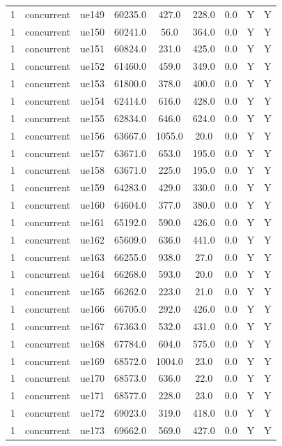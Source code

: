 \begin{table}[ht]
\begin{tabular}{|c|c|c|c|c|c|c|c|c|}
1 & concurrent & ue149 & 60235.0 & 427.0 & 228.0 & 0.0 & Y & Y \\
1 & concurrent & ue150 & 60241.0 & 56.0 & 364.0 & 0.0 & Y & Y \\
1 & concurrent & ue151 & 60824.0 & 231.0 & 425.0 & 0.0 & Y & Y \\
1 & concurrent & ue152 & 61460.0 & 459.0 & 349.0 & 0.0 & Y & Y \\
1 & concurrent & ue153 & 61800.0 & 378.0 & 400.0 & 0.0 & Y & Y \\
1 & concurrent & ue154 & 62414.0 & 616.0 & 428.0 & 0.0 & Y & Y \\
1 & concurrent & ue155 & 62834.0 & 646.0 & 624.0 & 0.0 & Y & Y \\
1 & concurrent & ue156 & 63667.0 & 1055.0 & 20.0 & 0.0 & Y & Y \\
1 & concurrent & ue157 & 63671.0 & 653.0 & 195.0 & 0.0 & Y & Y \\
1 & concurrent & ue158 & 63671.0 & 225.0 & 195.0 & 0.0 & Y & Y \\
1 & concurrent & ue159 & 64283.0 & 429.0 & 330.0 & 0.0 & Y & Y \\
1 & concurrent & ue160 & 64604.0 & 377.0 & 380.0 & 0.0 & Y & Y \\
1 & concurrent & ue161 & 65192.0 & 590.0 & 426.0 & 0.0 & Y & Y \\
1 & concurrent & ue162 & 65609.0 & 636.0 & 441.0 & 0.0 & Y & Y \\
1 & concurrent & ue163 & 66255.0 & 938.0 & 27.0 & 0.0 & Y & Y \\
1 & concurrent & ue164 & 66268.0 & 593.0 & 20.0 & 0.0 & Y & Y \\
1 & concurrent & ue165 & 66262.0 & 223.0 & 21.0 & 0.0 & Y & Y \\
1 & concurrent & ue166 & 66705.0 & 292.0 & 426.0 & 0.0 & Y & Y \\
1 & concurrent & ue167 & 67363.0 & 532.0 & 431.0 & 0.0 & Y & Y \\
1 & concurrent & ue168 & 67784.0 & 604.0 & 575.0 & 0.0 & Y & Y \\
1 & concurrent & ue169 & 68572.0 & 1004.0 & 23.0 & 0.0 & Y & Y \\
1 & concurrent & ue170 & 68573.0 & 636.0 & 22.0 & 0.0 & Y & Y \\
1 & concurrent & ue171 & 68577.0 & 228.0 & 23.0 & 0.0 & Y & Y \\
1 & concurrent & ue172 & 69023.0 & 319.0 & 418.0 & 0.0 & Y & Y \\
1 & concurrent & ue173 & 69662.0 & 569.0 & 427.0 & 0.0 & Y & Y \\

\end{tabular}
\end{table}
